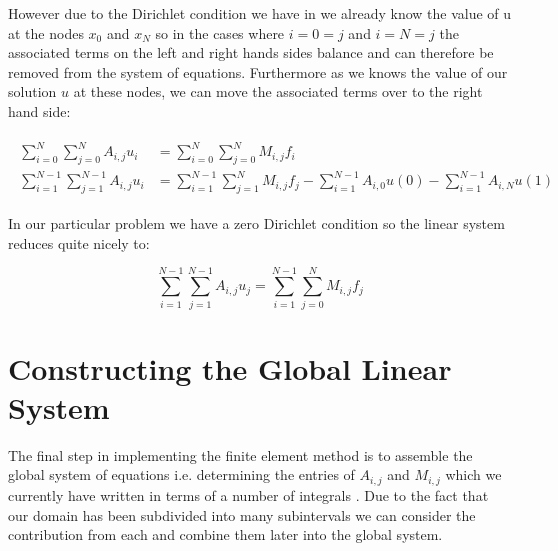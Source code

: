 However due to the Dirichlet condition we have in  we already know the value
of u at the nodes $x_0$ and $x_N$ so in the cases where $i = 0 = j$ and $i = N = j$ the associated terms on the left
and right hands sides balance and can therefore be removed from the system of equations. Furthermore as we knows the
value of our solution $u$ at these nodes, we can move the associated terms over to the right hand side:

\begin{align}
  \begin{split}
	\sum_{i=0}^N\sum_{j=0}^NA_{i,j}u_i &= \sum_{i=0}^N\sum_{j=0}^NM_{i,j}f_i \\
    \sum_{i=1}^{N-1}\sum_{j=1}^{N-1}A_{i,j}u_i &= \sum_{i=1}^{N-1}\sum_{j=1}^{N}M_{i,j}f_j
                                                - \sum_{i=1}^{N-1}A_{i,0}u(0)
                                                - \sum_{i=1}^{N-1}A_{i,N}u(1)
  \end{split}
\end{align}

In our particular problem we have a zero Dirichlet condition so the linear system reduces quite nicely to:

\begin{equation}
	\sum_{i=1}^{N-1}\sum_{j=1}^{N-1}A_{i,j}u_j = \sum_{i=1}^{N-1}\sum_{j=0}^NM_{i,j}f_j
\end{equation}

\section{Constructing the Global Linear System}

The final step in implementing the finite element method is to assemble the global system of equations i.e.
determining the entries of $A_{i,j}$ and $M_{i,j}$ which we currently have written in terms of a number of
integrals . Due to the fact that our domain has been subdivided into 
many subintervals we can consider the contribution from each and combine them later into the global system.

